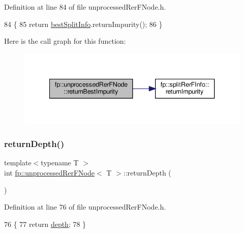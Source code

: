 Definition at line 84 of file unprocessed\+Rer\+F\+Node.\+h.


\begin{DoxyCode}
84                                                   \{
85                     \textcolor{keywordflow}{return} \hyperlink{classfp_1_1unprocessedRerFNode_acf98051b30cb1c0f2e62bb7df51c0884}{bestSplitInfo}.returnImpurity();
86                 \}
\end{DoxyCode}
Here is the call graph for this function\+:
\nopagebreak
\begin{figure}[H]
\begin{center}
\leavevmode
\includegraphics[width=340pt]{classfp_1_1unprocessedRerFNode_a15b562553cf6417806ee8085ed4a1725_cgraph}
\end{center}
\end{figure}
\mbox{\label{classfp_1_1unprocessedRerFNode_a37f1b49ac906ec2921365a35d1a5b96c}} 
\subsubsection{\texorpdfstring{return\+Depth()}{returnDepth()}}
{\footnotesize\ttfamily template$<$typename T $>$ \\
int \hyperlink{classfp_1_1unprocessedRerFNode}{fp\+::unprocessed\+Rer\+F\+Node}$<$ T $>$\+::return\+Depth (\begin{DoxyParamCaption}{ }\end{DoxyParamCaption})\hspace{0.3cm}{\ttfamily [inline]}}



Definition at line 76 of file unprocessed\+Rer\+F\+Node.\+h.


\begin{DoxyCode}
76                                         \{
77                     \textcolor{keywordflow}{return} \hyperlink{classfp_1_1unprocessedRerFNode_ad54ee9ea4003179b8304afb4f20d3a84}{depth};
78                 \}
\end{DoxyCode}
\mbox{\label{classfp_1_1unprocessedRerFNode_ae8b096a92819dbb811d1319d5c4eaecd}} 
